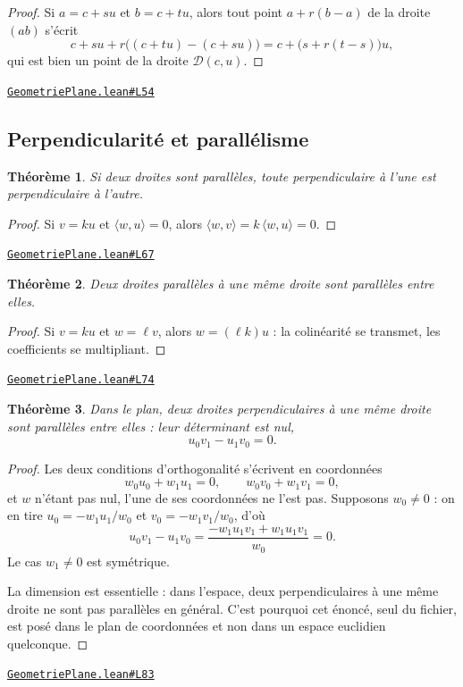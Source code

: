 \documentclass[11pt,a4paper]{article}
\theoremstyle{definition}
\theoremstyle{plain}
\newtheorem{theoreme}{Théorème}
\newcommand{\source}[2]{\par\smallskip\noindent\hfill{\footnotesize\href{#1}{\texttt{#2}}}\par\smallskip}
\begin{document}
\begin{proof}
Si $a = c + su$ et $b = c + tu$, alors tout point $a + r(b - a)$ de la droite $(ab)$
s'écrit
\[ c + su + r\bigl((c + tu) - (c + su)\bigr) = c + \bigl(s + r(t - s)\bigr)u , \]
qui est bien un point de la droite $\mathcal{D}(c, u)$.
\end{proof}
\source{https://github.com/Commutator-IO/learn-lean/blob/main/cours/01-college/02-geometrie-plane/GeometriePlane.lean\#L54}{GeometriePlane.lean\#L54}

\subsection{Perpendicularité et parallélisme}

\begin{theoreme}
Si deux droites sont parallèles, toute perpendiculaire à l'une est perpendiculaire à
l'autre.
\end{theoreme}

\begin{proof}
Si $v = ku$ et $\langle w, u\rangle = 0$, alors
$\langle w, v\rangle = k\,\langle w, u\rangle = 0$.
\end{proof}
\source{https://github.com/Commutator-IO/learn-lean/blob/main/cours/01-college/02-geometrie-plane/GeometriePlane.lean\#L67}{GeometriePlane.lean\#L67}

\begin{theoreme}
Deux droites parallèles à une même droite sont parallèles entre elles.
\end{theoreme}

\begin{proof}
Si $v = ku$ et $w = \ell v$, alors $w = (\ell k)u$ : la colinéarité se transmet, les
coefficients se multipliant.
\end{proof}
\source{https://github.com/Commutator-IO/learn-lean/blob/main/cours/01-college/02-geometrie-plane/GeometriePlane.lean\#L74}{GeometriePlane.lean\#L74}

\begin{theoreme}
Dans le plan, deux droites perpendiculaires à une même droite sont parallèles entre
elles : leur déterminant est nul,
\[ u_0 v_1 - u_1 v_0 = 0 . \]
\end{theoreme}

\begin{proof}
Les deux conditions d'orthogonalité s'écrivent en coordonnées
\[ w_0 u_0 + w_1 u_1 = 0, \qquad w_0 v_0 + w_1 v_1 = 0 , \]
et $w$ n'étant pas nul, l'une de ses coordonnées ne l'est pas. Supposons $w_0 \ne 0$ : on
en tire $u_0 = -w_1 u_1 / w_0$ et $v_0 = -w_1 v_1 / w_0$, d'où
\[ u_0 v_1 - u_1 v_0 = \frac{-w_1 u_1 v_1 + w_1 u_1 v_1}{w_0} = 0 . \]
Le cas $w_1 \ne 0$ est symétrique.

La dimension est essentielle : dans l'espace, deux perpendiculaires à une même droite ne
sont pas parallèles en général. C'est pourquoi cet énoncé, seul du fichier, est posé dans
le plan de coordonnées et non dans un espace euclidien quelconque.
\end{proof}
\source{https://github.com/Commutator-IO/learn-lean/blob/main/cours/01-college/02-geometrie-plane/GeometriePlane.lean\#L83}{GeometriePlane.lean\#L83}
\end{document}
